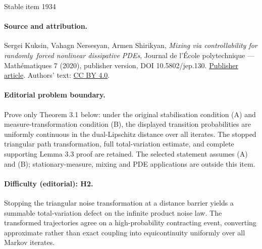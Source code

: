 \documentclass[11pt]{article}
\theoremstyle{plain}
\theoremstyle{definition}
\begin{document}
\begin{center}{\Large Stable item 1934}\end{center}
\paragraph{Source and attribution.}
Sergei Kuksin, Vahagn Nersesyan, Armen Shirikyan, \emph{Mixing via controllability for randomly forced nonlinear dissipative PDEs}, Journal de l’École polytechnique — Mathématiques 7 (2020), publisher version, DOI 10.5802/jep.130. \href{https://jep.centre-mersenne.org/articles/10.5802/jep.130/}{Publisher article}. Authors' text: \href{https://creativecommons.org/licenses/by/4.0/}{CC BY 4.0}.
\paragraph{Editorial problem boundary.}
Prove only Theorem 3.1 below: under the original stabilisation condition (A) and measure-transformation condition (B), the displayed transition probabilities are uniformly continuous in the dual-Lipschitz distance over all iterates. The stopped triangular path transformation, full total-variation estimate, and complete supporting Lemma 3.3 proof are retained. The selected statement assumes (A) and (B); stationary-measure, mixing and PDE applications are outside this item.
\paragraph{Difficulty (editorial): H2.}
Stopping the triangular noise transformation at a distance barrier yields a summable total-variation defect on the infinite product noise law. The transformed trajectories agree on a high-probability contracting event, converting approximate rather than exact coupling into equicontinuity uniformly over all Markov iterates.
\end{document}
